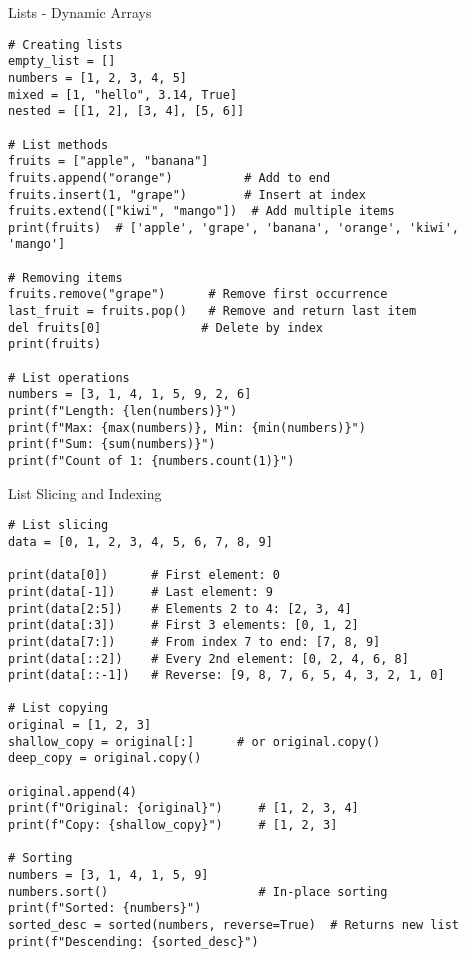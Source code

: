 \begin{frame}[fragile]{Lists - Dynamic Arrays}
    \begin{codeblock}
        \begin{lstlisting}
# Creating lists
empty_list = []
numbers = [1, 2, 3, 4, 5]
mixed = [1, "hello", 3.14, True]
nested = [[1, 2], [3, 4], [5, 6]]

# List methods
fruits = ["apple", "banana"]
fruits.append("orange")          # Add to end
fruits.insert(1, "grape")        # Insert at index
fruits.extend(["kiwi", "mango"])  # Add multiple items
print(fruits)  # ['apple', 'grape', 'banana', 'orange', 'kiwi', 'mango']

# Removing items
fruits.remove("grape")      # Remove first occurrence
last_fruit = fruits.pop()   # Remove and return last item
del fruits[0]              # Delete by index
print(fruits)

# List operations
numbers = [3, 1, 4, 1, 5, 9, 2, 6]
print(f"Length: {len(numbers)}")
print(f"Max: {max(numbers)}, Min: {min(numbers)}")
print(f"Sum: {sum(numbers)}")
print(f"Count of 1: {numbers.count(1)}")
        \end{lstlisting}
    \end{codeblock}
\end{frame}

\begin{frame}[fragile]{List Slicing and Indexing}
    \begin{codeblock}
        \begin{lstlisting}
# List slicing
data = [0, 1, 2, 3, 4, 5, 6, 7, 8, 9]

print(data[0])      # First element: 0
print(data[-1])     # Last element: 9
print(data[2:5])    # Elements 2 to 4: [2, 3, 4]
print(data[:3])     # First 3 elements: [0, 1, 2]
print(data[7:])     # From index 7 to end: [7, 8, 9]
print(data[::2])    # Every 2nd element: [0, 2, 4, 6, 8]
print(data[::-1])   # Reverse: [9, 8, 7, 6, 5, 4, 3, 2, 1, 0]

# List copying
original = [1, 2, 3]
shallow_copy = original[:]      # or original.copy()
deep_copy = original.copy()

original.append(4)
print(f"Original: {original}")     # [1, 2, 3, 4]
print(f"Copy: {shallow_copy}")     # [1, 2, 3]

# Sorting
numbers = [3, 1, 4, 1, 5, 9]
numbers.sort()                     # In-place sorting
print(f"Sorted: {numbers}")
sorted_desc = sorted(numbers, reverse=True)  # Returns new list
print(f"Descending: {sorted_desc}")
        \end{lstlisting}
    \end{codeblock}
\end{frame}

